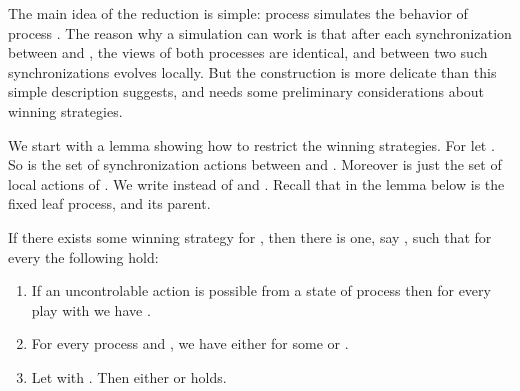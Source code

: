 \documentclass{llncs}
\begin{document}
The main idea of the reduction is simple: process  simulates
the behavior of process . The reason why a simulation can work is
that after each synchronization between  and , the views of both
processes are identical, and between two such synchronizations 
evolves locally. But the construction is more delicate than this
simple description suggests, and needs some preliminary considerations
about winning strategies.

We start with a lemma showing how to
restrict the winning strategies. 
For  let . So  is the set of
synchronization actions between  and . Moreover  is
just the set of local actions of . We write  instead of
 and . Recall that in
the lemma below  is the fixed leaf process, and  its
parent. 


 \begin{lemma}\label{l:separation}
  If there exists some winning strategy for , then there is one, say
  ,  such that for every   the
  following hold:
  \begin{enumerate}
  \item If an uncontrolable action is possible from a state  of
    process  then for every play  with  we have
    .
  \item For every process  and , we have either
     for some  or .
  \item Let  with . Then either
     or 
    holds.
  \end{enumerate}
\end{lemma}
\end{document}
